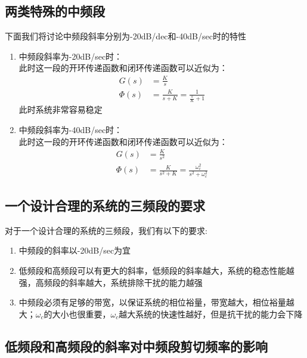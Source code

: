 \subsection{两类特殊的中频段}
下面我们将讨论中频段斜率分别为-20dB/dec和-40dB/sec时的特性
\begin{enumerate}
    \item 中频段斜率为-20dB/sec时：\\
          此时这一段的开环传递函数和闭环传递函数可以近似为：
          \begin{equation*}
            \begin{split}
                G(s) &= \frac{K}{s} \\
                \Phi(s) &= \frac{K}{s + K} = \frac{1}{\frac{s}{K} + 1}               
            \end{split}
          \end{equation*}
          此时系统非常容易稳定
    \item 中频段斜率为-40dB/sec时：\\
          此时这一段的开环传递函数和闭环传递函数可以近似为：
          \begin{equation*}
            \begin{split}
                G(s) &= \frac{K}{s^2} \\
                \Phi(s) &= \frac{K}{s^2 + K} = \frac{\omega_c^2}{s^2 + \omega_c^2}
            \end{split}
          \end{equation*}
\end{enumerate}

\subsection{一个设计合理的系统的三频段的要求}
对于一个设计合理的系统的三频段，我们有以下的要求:
\begin{enumerate}
    \item 中频段的斜率以-20dB/sec为宜
    \item 低频段和高频段可以有更大的斜率，低频段的斜率越大，系统的稳态性能越强，高频段的斜率越大，系统排除干扰的能力越强
    \item 中频段必须有足够的带宽，以保证系统的相位裕量，带宽越大，相位裕量越大；$\omega_c$的大小也很重要，$\omega_c$越大系统的快速性越好，但是抗干扰的能力会下降
\end{enumerate}

\subsection{低频段和高频段的斜率对中频段剪切频率的影响}

